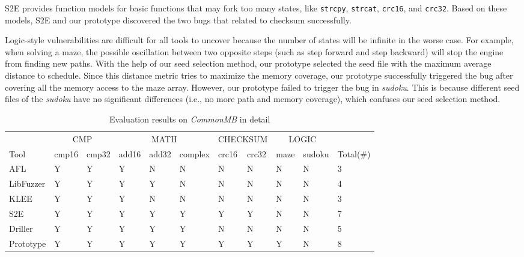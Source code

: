 S2E provides function models for basic functions that may fork too many states, like \texttt{strcpy}, \texttt{strcat}, \texttt{crc16}, and \texttt{crc32}. Based on these models, S2E and our prototype discovered the two bugs that related to checksum successfully. 

Logic-style vulnerabilities are difficult for all tools to uncover because the number of states will be infinite in the worse case.
 For example, when solving a maze, the possible oscillation between two opposite steps (such as step forward and step backward) will stop the engine from finding new paths.
 With the help of our seed selection method, our prototype selected the seed file with the maximum average distance to schedule. Since this distance metric tries to maximize the memory coverage, our prototype successfully triggered the bug after covering all the memory access to the maze array. 
 However, our prototype failed to trigger the bug in \textit{sudoku}. 
 This is because different seed files of the \textit{sudoku} have no significant differences (i.e., no more path and memory coverage), which confuses our seed selection method.

\begin{table}
  \caption{\label{CommonMB-results-detail}Evaluation results on \textit{CommonMB} in detail}
  \centering
	\begin{tabular}{p{1.5cm}<{\centering} | p{0.8cm}<{\centering} p{0.9cm}<{\centering} | p{0.7cm}<{\centering}
	p{0.7cm}<{\centering} p{1.2cm}<{\centering} | p{0.8cm}<{\centering} p{0.8cm}<{\centering} | p{0.8cm}<{\centering} p{1cm}<{\centering} | p{1.2cm}<{\centering}}
		\toprule
	& \multicolumn{2}{c}{CMP}  & \multicolumn{3}{c}{MATH} & \multicolumn{2}{c}{CHECKSUM} & 	\multicolumn{2}{c}{LOGIC} & \\ 
	    Tool & cmp16 & cmp32 & add16 & add32 & complex & crc16 & crc32 & maze & sudoku & Total(\#) \\
		\midrule
		AFL 		& Y & Y & Y & N & N & N & N & N & N & 3 \\
		LibFuzzer	& Y & Y & Y & Y & N & N & N & N & N & 4\\
		KLEE		& Y & Y & Y & N & N & N & N & N & N & 3\\
		S2E			& Y & Y & Y & Y & Y & Y & Y & N & N & 7\\
		Driller		& Y & Y & Y & Y & Y & N & N & N & N & 5\\
		Prototype	& Y & Y & Y & Y & Y & Y & Y & Y & N & 8\\
	 \bottomrule
	\end{tabular}
\end{table}

